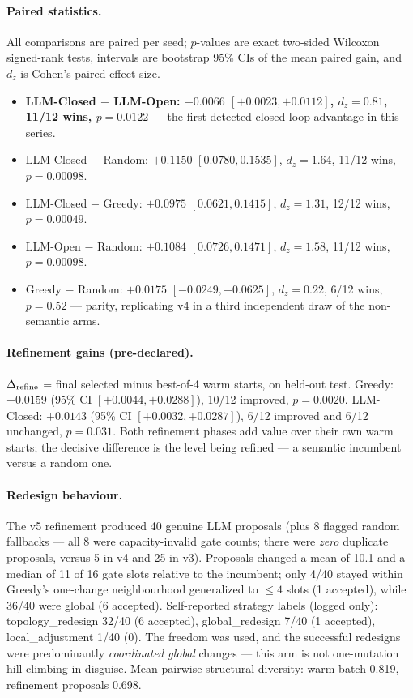 \documentclass[11pt]{article}
\begin{document}
\paragraph{Paired statistics.}
All comparisons are paired per seed; $p$-values are exact two-sided Wilcoxon signed-rank tests, intervals are bootstrap 95\% CIs of the mean paired gain, and $d_z$ is Cohen's paired effect size.
\begin{itemize}[nosep]
\item \textbf{LLM-Closed $-$ LLM-Open: $+0.0066$ $[+0.0023, +0.0112]$, $d_z=0.81$, 11/12 wins, $p=0.0122$} --- the first detected closed-loop advantage in this series.
\item LLM-Closed $-$ Random: $+0.1150$ $[0.0780, 0.1535]$, $d_z=1.64$, 11/12 wins, $p=0.00098$.
\item LLM-Closed $-$ Greedy: $+0.0975$ $[0.0621, 0.1415]$, $d_z=1.31$, 12/12 wins, $p=0.00049$.
\item LLM-Open $-$ Random: $+0.1084$ $[0.0726, 0.1471]$, $d_z=1.58$, 11/12 wins, $p=0.00098$.
\item Greedy $-$ Random: $+0.0175$ $[-0.0249, +0.0625]$, $d_z=0.22$, 6/12 wins, $p=0.52$ --- parity, replicating v4 in a third independent draw of the non-semantic arms.
\end{itemize}

\paragraph{Refinement gains (pre-declared).}
$\Delta_{\rm refine}$ = final selected minus best-of-4 warm starts, on held-out test.
Greedy: $+0.0159$ (95\% CI $[+0.0044, +0.0288]$), 10/12 improved, $p=0.0020$.
LLM-Closed: $+0.0143$ (95\% CI $[+0.0032, +0.0287]$), 6/12 improved and 6/12 unchanged, $p=0.031$.
Both refinement phases add value over their own warm starts; the decisive difference is the level being refined --- a semantic incumbent versus a random one.

\paragraph{Redesign behaviour.}
The v5 refinement produced 40 genuine LLM proposals (plus 8 flagged random fallbacks --- all 8 were capacity-invalid gate counts; there were \emph{zero} duplicate proposals, versus 5 in v4 and 25 in v3).
Proposals changed a mean of 10.1 and a median of 11 of 16 gate slots relative to the incumbent; only 4/40 stayed within Greedy's one-change neighbourhood generalized to $\le 4$ slots (1 accepted), while 36/40 were global ($6$ accepted).
Self-reported strategy labels (logged only): topology\_redesign 32/40 (6 accepted), global\_redesign 7/40 (1 accepted), local\_adjustment 1/40 (0).
The freedom was used, and the successful redesigns were predominantly \emph{coordinated global} changes --- this arm is not one-mutation hill climbing in disguise.
Mean pairwise structural diversity: warm batch 0.819, refinement proposals 0.698.
\end{document}
